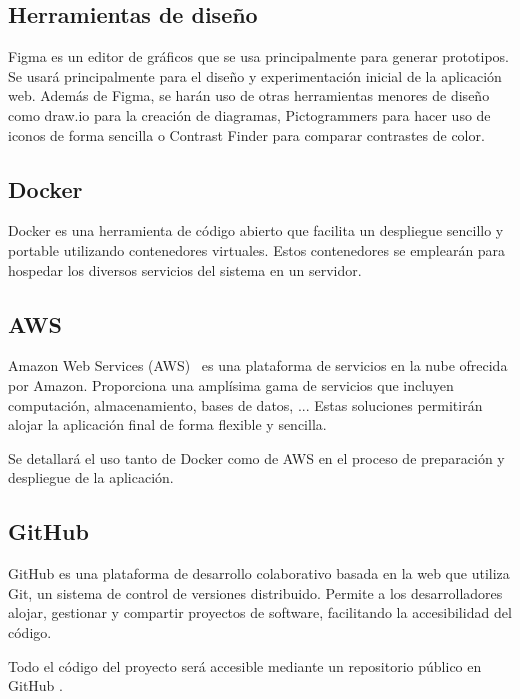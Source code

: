 \subsection{Herramientas de diseño}

Figma \cite{figma} es un editor de gráficos que se usa principalmente para generar prototipos. Se usará principalmente para
el diseño y experimentación inicial de la aplicación web. Además de Figma, se harán uso de otras herramientas
menores de diseño como draw.io \cite{draw.io} para la creación de diagramas, Pictogrammers \cite{pictogrammers} para hacer uso de
iconos de forma sencilla o Contrast Finder \cite{contrastFinder} para comparar contrastes de color.

\subsection{Docker}

Docker \cite{docker} es una herramienta de código abierto que facilita un despliegue sencillo y portable utilizando contenedores
virtuales. Estos contenedores se emplearán para hospedar los diversos servicios del sistema en un
servidor.

\subsection{AWS}

Amazon Web Services (AWS)~\cite{aws} es una plataforma de servicios en la nube ofrecida por Amazon. Proporciona
una amplísima gama de servicios que incluyen computación, almacenamiento, bases de datos, ... Estas soluciones permitirán
alojar la aplicación final de forma flexible y sencilla.

Se detallará el uso tanto de Docker como de AWS en el proceso de preparación y despliegue de la aplicación.

\subsection{GitHub}

GitHub \cite{github} es una plataforma de desarrollo colaborativo basada en la web que utiliza Git, un sistema de control de versiones
distribuido. Permite a los desarrolladores alojar, gestionar y compartir proyectos de software, facilitando la accesibilidad
del código.

Todo el código del proyecto será accesible mediante un repositorio público en GitHub \cite{repositorio} .

